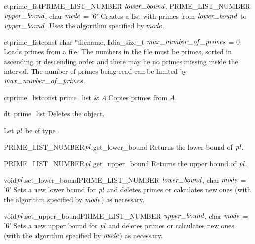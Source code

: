 \begin{fcode}{ct}{prime_list}{PRIME_LIST_NUMBER $\lowerbound$, PRIME_LIST_NUMBER $\upperbound$, char $\mathit{mode}$ = '6'}
  Creates a list with primes from $\lowerbound$ to $\upperbound$.  Uses the algorithm specified
  by $\mathit{mode}$.
\end{fcode}

\begin{fcode}{ct}{prime_list}{const char *filename, lidia_size_t $\maxnumberofprimes$ = 0}
  Loads primes from a file.  The numbers in the file must be primes, sorted in ascending or
  descending order and there may be no primes missing inside the interval.  The number of primes
  being read can be limited by $\maxnumberofprimes$.
\end{fcode}

\begin{fcode}{ct}{prime_list}{const prime_list & $A$}
  Copies primes from $A$.
\end{fcode}

\begin{fcode}{dt}{~prime_list}{}
  Deletes the  object.
\end{fcode}



\BASIC

Let $\mathit{pl}$ be of type .

\begin{cfcode}{PRIME_LIST_NUMBER}{$\mathit{pl}$.get_lower_bound}{}
  Returns the lower bound of $\mathit{pl}$.
\end{cfcode}

\begin{cfcode}{PRIME_LIST_NUMBER}{$\mathit{pl}$.get_upper_bound}{}
  Returns the upper bound of $\mathit{pl}$.
\end{cfcode}

\begin{fcode}{void}{$\mathit{pl}$.set_lower_bound}{PRIME_LIST_NUMBER $\lowerbound$, char $\mathit{mode}$ = '6'}
  Sets a new lower bound for $\mathit{pl}$ and deletes primes or calculates new ones (with the algorithm
  specified by $\mathit{mode}$) as necessary.
\end{fcode}

\begin{fcode}{void}{$\mathit{pl}$.set_upper_bound}{PRIME_LIST_NUMBER $\upperbound$, char $\mathit{mode}$ = '6'}
  Sets a new upper bound for $\mathit{pl}$ and deletes primes or calculates new ones (with the algorithm
  specified by $\mathit{mode}$) as necessary.
\end{fcode}

